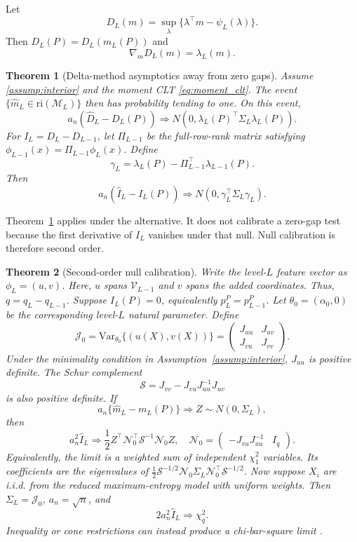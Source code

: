 \documentclass[twoside]{article}
\newtheorem{theorem}{Theorem}
\theoremstyle{definition}
\theoremstyle{remark}
\newcommand{\M}{\mathcal M}
\newcommand{\V}{\mathcal V}
\newcommand{\ri}{\mathrm{ri}}
\begin{document}
Let
\[
  D_L(m)=\sup_{\lambda}\{\lambda^\top m-\psi_L(\lambda)\}.
\]
Then $D_L(P)=D_L(m_L(P))$ and
\[
  \nabla_m D_L(m)=\lambda_L(m).
\]

\begin{theorem}[Delta-method asymptotics away from zero gaps]
\label{thm:clt}
Assume \ref{assump:interior} and the moment CLT \eqref{eq:moment_clt}. The event $\{\widehat m_L\in\ri(\M_L)\}$ then has probability tending to one. On this event,
\[
  a_n(\widehat D_L-D_L(P))
  \Rightarrow
  N(0,\lambda_L(P)^\top\Sigma_L\lambda_L(P)).
\]
For $I_L=D_L-D_{L-1}$, let $\Pi_{L-1}$ be the full-row-rank matrix satisfying $\phi_{L-1}(x)=\Pi_{L-1}\phi_L(x)$. Define
\[
  \gamma_L=
  \lambda_L(P)-\Pi_{L-1}^\top\lambda_{L-1}(P).
\]
Then
\begin{equation}
  a_n(\widehat I_L-I_L(P))
  \Rightarrow
  N(0,\gamma_L^\top\Sigma_L\gamma_L).
  \label{eq:I_clt}
\end{equation}
\end{theorem}

Theorem~\ref{thm:clt} applies under the alternative. It does not calibrate a zero-gap test because the first derivative of $I_L$ vanishes under that null. Null calibration is therefore second order.

\begin{theorem}[Second-order null calibration]
\label{thm:null}
Write the level-$L$ feature vector as $\phi_L=(u,v)$. Here, $u$ spans $\V_{L-1}$ and $v$ spans the added coordinates. Thus, $q=q_L-q_{L-1}$. Suppose $I_L(P)=0$, equivalently $p_L^P=p_{L-1}^P$. Let $\theta_0=(\alpha_0,0)$ be the corresponding level-$L$ natural parameter. Define
\[
  \mathcal J_0=\mathrm{Var}_{\theta_0}\{(u(X),v(X))\}
  =\begin{pmatrix} J_{uu} & J_{uv}\\ J_{vu} & J_{vv}\end{pmatrix}.
\]
Under the minimality condition in Assumption~\ref{assump:interior}, $J_{uu}$ is positive definite. The Schur complement
\[
  \mathcal S=J_{vv}-J_{vu}J_{uu}^{-1}J_{uv}
\]
is also positive definite. If
\[
  a_n\{\widehat m_L-m_L(P)\}\Rightarrow Z\sim N(0,\Sigma_L),
\]
then
\begin{equation}
  a_n^2\widehat I_L
  \Rightarrow
  \frac12 Z^\top \mathcal{N}_0^\top \mathcal S^{-1}\mathcal{N}_0Z,
  \quad
  \mathcal{N}_0=\begin{pmatrix}-J_{vu}J_{uu}^{-1} & I_q\end{pmatrix}.
  \label{eq:null_quad}
\end{equation}
Equivalently, the limit is a weighted sum of independent $\chi^2_1$ variables. Its coefficients are the eigenvalues of $\frac12 \mathcal S^{-1/2}\mathcal{N}_0\Sigma_L\mathcal{N}_0^\top \mathcal S^{-1/2}$. Now suppose $X_i$ are i.i.d. from the reduced maximum-entropy model with uniform weights. Then $\Sigma_L=\mathcal J_0$, $a_n=\sqrt n$, and
\[
  2a_n^2\widehat I_L\Rightarrow \chi^2_q.
\]
Inequality or cone restrictions can instead produce a chi-bar-square limit \citep{self_1987_AsymptoticPropertiesMaximum}.
\end{theorem}
\end{document}
